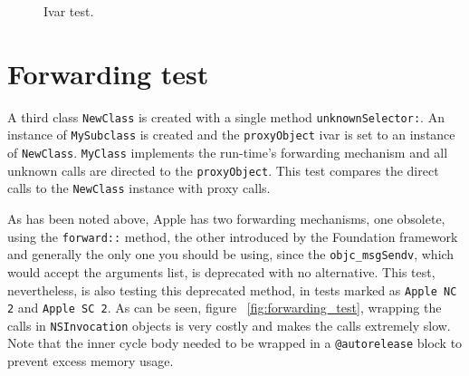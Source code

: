 \begin{figure}[H]
  \centering{}
  \caption{Ivar test.}
  \label{fig:ivar_test}
\end{figure}


\section{Forwarding test}

A third class \verb=NewClass= is created with a single method \verb=unknownSelector:=. An instance of \verb=MySubclass= is created and the \verb=proxyObject= ivar is set to an instance of \verb=NewClass=. \verb=MyClass= implements the run-time's forwarding mechanism and all unknown calls are directed to the \verb=proxyObject=. This test compares the direct calls to the \verb=NewClass= instance with proxy calls.

As has been noted above, Apple has two forwarding mechanisms, one obsolete, using the \verb=forward::= method, the other introduced by the Foundation framework and generally the only one you should be using, since the \verb=objc_msgSendv=, which would accept the arguments list, is deprecated with no alternative. This test, nevertheless, is also testing this deprecated method, in tests marked as \verb=Apple NC 2= and \verb=Apple SC 2=. As can be seen, figure ~\ref{fig:forwarding_test}, wrapping the calls in \verb=NSInvocation= objects is very costly and makes the calls extremely slow. Note that the inner cycle body needed to be wrapped in a \verb=@autorelease= block to prevent excess memory usage.

